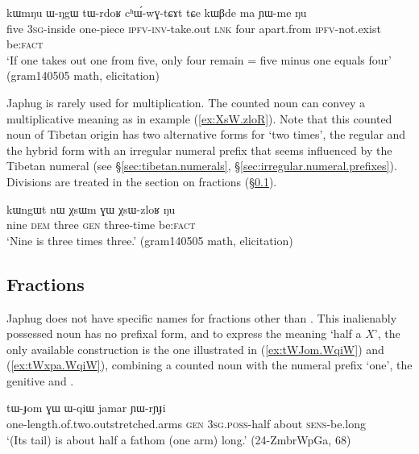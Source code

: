 \begin{exe}
\ex \label{ex:tWrdoR.chWwGtCAt}
\gll kɯmŋu ɯ-ŋgɯ tɯ-rdoʁ cʰɯ́-wɣ-tɕɤt tɕe kɯβde ma ɲɯ-me ŋu \\
 five \textsc{3sg}-inside one-piece \textsc{ipfv}-\textsc{inv}-take.out \textsc{lnk} four apart.from \textsc{ipfv}-not.exist be:\textsc{fact} \\
\glt `If one takes out one from five, only four remain = five minus one equals four' (gram140505 math, elicitation)
\end{exe}

Japhug is rarely used for multiplication. The counted noun  can convey a multiplicative meaning  as in example (\ref{ex:XsW.zloR}). Note that this counted noun of Tibetan origin has two alternative forms for `two times', the regular   and the hybrid form  with an irregular numeral prefix that seems influenced by the Tibetan numeral  (see §\ref{sec:tibetan.numerals}, §\ref{sec:irregular.numeral.prefixes}). Divisions are treated in the section on fractions (§\ref{sec:fractions}).

\begin{exe}
\ex \label{ex:XsW.zloR}
\gll  kɯngɯt nɯ χsɯm ɣɯ χsɯ-zloʁ ŋu \\
 nine \textsc{dem} three \textsc{gen} three-time be:\textsc{fact} \\
\glt `Nine is three times three.' (gram140505 math, elicitation)
\end{exe}
 
 
\subsection{Fractions} \label{sec:fractions}
Japhug does not have specific names for fractions other than .  This inalienably possessed noun has no prefixal form, and to express the meaning `half a $X$', the only available construction is the one illustrated in (\ref{ex:tWJom.WqiW}) and (\ref{ex:tWxpa.WqiW}), combining a counted noun with the numeral prefix `one', the genitive  and .


\begin{exe}
\ex \label{ex:tWJom.WqiW}
\gll tɯ-ɟom ɣɯ ɯ-qiɯ jamar ɲɯ-rɲɟi \\
one-length.of.two.outstretched.arms \textsc{gen} \textsc{3sg}.\textsc{poss}-half about \textsc{sens}-be.long \\
\glt `(Its tail) is about half a fathom (one arm) long.' (24-ZmbrWpGa, 68)
\end{exe}

